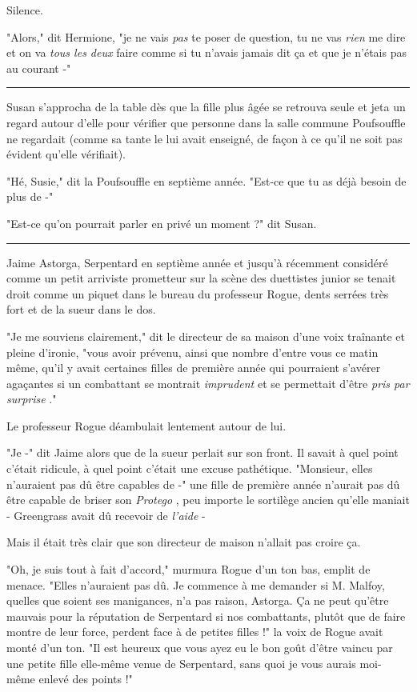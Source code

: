Silence.

"Alors," dit Hermione, "je ne vais \emph{pas}  te poser de question, tu ne vas \emph{rien}  me dire et on va \emph{tous les deux}  faire comme si tu n'avais jamais dit ça et que je n'étais pas au courant -"
\par\noindent\rule{\textwidth}{0.4pt}
Susan s'approcha de la table dès que la fille plus âgée se retrouva seule et jeta un regard autour d'elle pour vérifier que personne dans la salle commune Poufsouffle ne regardait (comme sa tante le lui avait enseigné, de façon à ce qu'il ne soit pas évident qu'elle vérifiait).

"Hé, Susie," dit la Poufsouffle en septième année. "Est-ce que tu as déjà besoin de plus de -"

"Est-ce qu'on pourrait parler en privé un moment ?" dit Susan.
\par\noindent\rule{\textwidth}{0.4pt}
Jaime Astorga, Serpentard en septième année et jusqu'à récemment considéré comme un petit arriviste prometteur sur la scène des duettistes junior se tenait droit comme un piquet dans le bureau du professeur Rogue, dents serrées très fort et de la sueur dans le dos.

"Je me souviens clairement," dit le directeur de sa maison d'une voix traînante et pleine d'ironie, "vous avoir prévenu, ainsi que nombre d'entre vous ce matin même, qu'il y avait certaines filles de première année qui pourraient s'avérer agaçantes si un combattant se montrait \emph{imprudent}  et se permettait d'être \emph{pris par surprise} ."

Le professeur Rogue déambulait lentement autour de lui.

"Je -" dit Jaime alors que de la sueur perlait sur son front. Il savait à quel point c'était ridicule, à quel point c'était une excuse pathétique. "Monsieur, elles n'auraient pas dû être capables de -" une fille de première année n'aurait pas dû être capable de briser son \emph{Protego} , peu importe le sortilège ancien qu'elle maniait - Greengrass avait dû recevoir de \emph{l'aide}  -

Mais il était très clair que son directeur de maison n'allait pas croire ça.

"Oh, je suis tout à fait d'accord," murmura Rogue d'un ton bas, emplit de menace. "Elles n'auraient pas dû. Je commence à me demander si M. Malfoy, quelles que soient ses manigances, n'a pas raison, Astorga. Ça ne peut qu'être mauvais pour la réputation de Serpentard si nos combattants, plutôt que de faire montre de leur force, perdent face à de petites filles !" la voix de Rogue avait monté d'un ton. "Il est heureux que vous ayez eu le bon goût d'être vaincu par une petite fille elle-même venue de Serpentard, sans quoi je vous aurais moi-même enlevé des points !"


